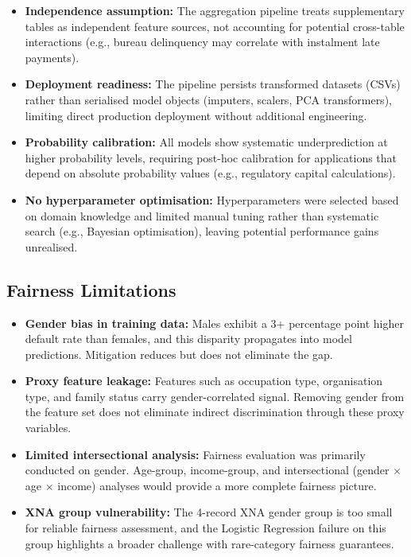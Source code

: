 \begin{itemize}
    \item \textbf{Independence assumption:} The aggregation pipeline treats supplementary tables as independent feature sources, not accounting for potential cross-table interactions (e.g., bureau delinquency may correlate with instalment late payments).
    \item \textbf{Deployment readiness:} The pipeline persists transformed datasets (CSVs) rather than serialised model objects (imputers, scalers, PCA transformers), limiting direct production deployment without additional engineering.
    \item \textbf{Probability calibration:} All models show systematic underprediction at higher probability levels, requiring post-hoc calibration for applications that depend on absolute probability values (e.g., regulatory capital calculations).
    \item \textbf{No hyperparameter optimisation:} Hyperparameters were selected based on domain knowledge and limited manual tuning rather than systematic search (e.g., Bayesian optimisation), leaving potential performance gains unrealised.
\end{itemize}

\subsection{Fairness Limitations}

\begin{itemize}
    \item \textbf{Gender bias in training data:} Males exhibit a 3+ percentage point higher default rate than females, and this disparity propagates into model predictions. Mitigation reduces but does not eliminate the gap.
    \item \textbf{Proxy feature leakage:} Features such as occupation type, organisation type, and family status carry gender-correlated signal. Removing gender from the feature set does not eliminate indirect discrimination through these proxy variables.
    \item \textbf{Limited intersectional analysis:} Fairness evaluation was primarily conducted on gender. Age-group, income-group, and intersectional (gender $\times$ age $\times$ income) analyses would provide a more complete fairness picture.
    \item \textbf{XNA group vulnerability:} The 4-record XNA gender group is too small for reliable fairness assessment, and the Logistic Regression failure on this group highlights a broader challenge with rare-category fairness guarantees.
\end{itemize}

